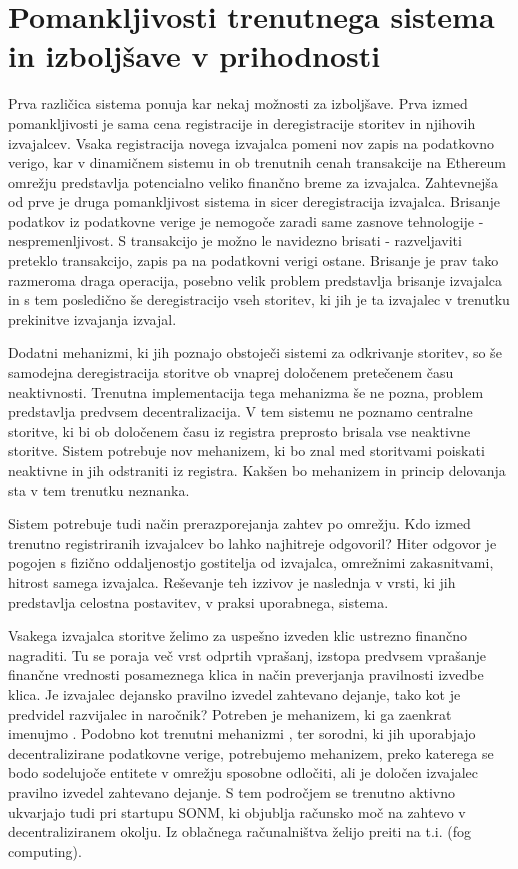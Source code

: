 \documentclass[a4paper, 12pt]{book}
\begin{document}
\section{Pomankljivosti trenutnega sistema in izboljšave v prihodnosti}

Prva različica sistema ponuja kar nekaj možnosti za izboljšave.
Prva izmed pomankljivosti je sama cena registracije in deregistracije storitev in njihovih izvajalcev.
Vsaka registracija novega izvajalca pomeni nov zapis na podatkovno verigo, kar v dinamičnem sistemu in ob trenutnih cenah transakcije na Ethereum omrežju predstavlja potencialno veliko finančno breme za izvajalca.
Zahtevnejša od prve je druga pomankljivost sistema in sicer deregistracija izvajalca.
Brisanje podatkov iz podatkovne verige je nemogoče zaradi same zasnove tehnologije - nespremenljivost.
S transakcijo je možno le navidezno brisati - razveljaviti preteklo transakcijo, zapis pa na podatkovni verigi ostane.
Brisanje je prav tako razmeroma draga operacija, posebno velik problem predstavlja brisanje izvajalca in s tem posledično še deregistracijo vseh storitev, ki jih je ta izvajalec v trenutku prekinitve izvajanja izvajal.

Dodatni mehanizmi, ki jih poznajo obstoječi sistemi za odkrivanje storitev, so še samodejna deregistracija storitve ob vnaprej določenem pretečenem času neaktivnosti.
Trenutna implementacija tega mehanizma še ne pozna, problem predstavlja predvsem decentralizacija.
V tem sistemu ne poznamo centralne storitve, ki bi ob določenem času iz registra preprosto brisala vse neaktivne storitve.
Sistem potrebuje nov mehanizem, ki bo znal med storitvami poiskati neaktivne in jih odstraniti iz registra. Kakšen bo mehanizem in princip delovanja sta v tem trenutku neznanka.

Sistem potrebuje tudi način prerazporejanja zahtev po omrežju.
Kdo izmed trenutno registriranih izvajalcev bo lahko najhitreje odgovoril?
Hiter odgovor je pogojen s fizično oddaljenostjo gostitelja od izvajalca, omrežnimi zakasnitvami, hitrost samega izvajalca. Reševanje teh izzivov je naslednja v vrsti, ki jih predstavlja celostna postavitev, v praksi uporabnega, sistema.


Vsakega izvajalca storitve želimo za uspešno izveden klic ustrezno finančno nagraditi. Tu se poraja več vrst odprtih vprašanj, izstopa predvsem vprašanje finančne vrednosti posameznega klica in način preverjanja pravilnosti izvedbe klica.
Je izvajalec dejansko pravilno izvedel zahtevano dejanje, tako kot je predvidel razvijalec in naročnik?
Potreben je mehanizem, ki ga zaenkrat imenujmo .
Podobno kot trenutni mehanizmi ,  ter sorodni, ki jih uporabjajo decentralizirane podatkovne verige, potrebujemo mehanizem, preko katerega se bodo sodelujoče entitete v omrežju sposobne odločiti, ali je določen izvajalec pravilno izvedel zahtevano dejanje.
S tem področjem se trenutno aktivno ukvarjajo tudi pri startupu SONM, ki objublja računsko moč na zahtevo v decentraliziranem okolju. Iz oblačnega računalništva želijo preiti na t.i.  (fog computing). \cite{Sonm}
\end{document}
